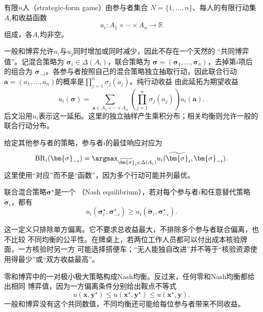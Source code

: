 \begin{definition}[有限战略式博弈]
\label{def:game-finite-strategic-game}
有限\(n\)人（strategic-form game）由参与者集合
\(N=\{1,\ldots,n\}\)、每人的有限行动集\(A_i\)和收益函数
\[
  u_i:A_1\times\cdots\times A_n\to\mathbb{R}
\]
组成，各$A_i$均非空。
\end{definition}
一般和博弈允许\(u_i\)与\(u_j\)同时增加或同时减少，因此不存在一个天然的
“共同博弈值”。记混合策略为
\(\bm{\sigma}_i\in\Delta(A_i)\)，联合策略为
\(\bm{\sigma}=(\bm{\sigma}_1,\ldots,\bm{\sigma}_n)\)，去掉第\(i\)项后的组合为
\(\bm{\sigma}_{-i}\)。各参与者按照自己的混合策略独立抽取行动，因此联合行动
\(\bm{a}=(a_1,\ldots,a_n)\)的概率是\(\prod_{j=1}^n\sigma_j(a_j)\)。纯行动收益
由此延拓为期望收益
\begin{equation}
  u_i(\bm{\sigma})
  =
  \sum_{\bm{a}\in A_1\times\cdots\times A_n}
  \left(
    \prod_{j=1}^{n}\sigma_j(a_j)
  \right)
  u_i(\bm{a}).
  \label{eq:game-mixed-payoff-extension}
\end{equation}
后文沿用\(u_i\)表示这一延拓。这里的独立抽样产生乘积分布；相关均衡则允许一般的
联合行动分布。

给定其他参与者的策略，参与者\(i\)的最佳响应对应为
\[
  \operatorname{BR}_i(\bm{\sigma}_{-i})
  =
  \argmax_{\widetilde{\bm{\sigma}}_i\in\Delta(A_i)}
  u_i(\widetilde{\bm{\sigma}}_i,\bm{\sigma}_{-i}).
\]
这里使用“对应”而不是“函数”，因为多个行动可能并列最优。

\begin{definition}[Nash均衡]
\label{def:game-nash-equilibrium}
联合混合策略\(\bm{\sigma}^\star\)是一个
（Nash equilibrium），若对每个参与者\(i\)和任意替代策略
\(\widetilde{\bm{\sigma}}_i\)，都有
\begin{equation}
  u_i(\bm{\sigma}_i^\star,\bm{\sigma}_{-i}^\star)
  \geq
  u_i(\widetilde{\bm{\sigma}}_i,\bm{\sigma}_{-i}^\star).
  \label{eq:game-nash-no-unilateral-deviation}
\end{equation}
\end{definition}

这一定义只排除单方偏离。它不要求总收益最大，不排除多个参与者联合偏离，也不比较
不同均衡的公平性。在牌桌上，若两位工作人员都可以付出成本核验牌面，一方核验时另一方
可能选择搭便车；“无人能独自改进”并不等于“核验资源使用得最少”或“双方收益最高”。

零和博弈中的一对极小极大策略构成Nash均衡。反过来，任何零和Nash均衡都给出相同
博弈值，因为一方偏离条件分别给出鞍点不等式
\[
  u(\bm{x},\bm{y}^\star)
  \leq
  u(\bm{x}^\star,\bm{y}^\star)
  \leq
  u(\bm{x}^\star,\bm{y}).
\]
一般和博弈没有这个共同数值，不同均衡还可能给每位参与者带来不同收益。


